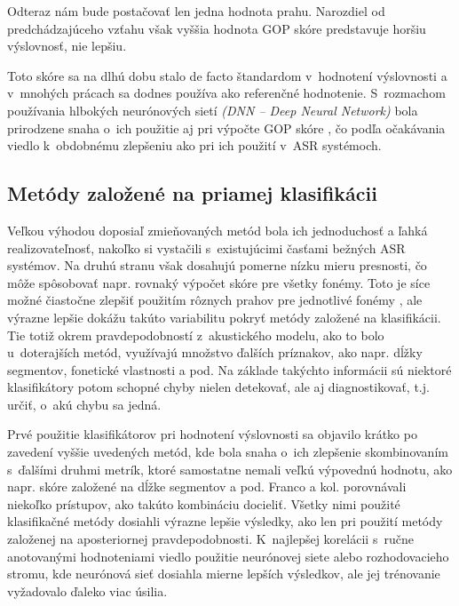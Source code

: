 Odteraz nám bude postačovať len jedna hodnota prahu. Narozdiel od predchádzajúceho vzťahu však vyššia hodnota GOP skóre predstavuje horšiu výslovnosť, nie lepšiu.

Toto skóre sa na dlhú dobu stalo de facto štandardom v~hodnotení výslovnosti a v~mnohých prácach sa dodnes používa ako referenčné hodnotenie.
S~rozmachom používania hlbokých neurónových sietí \textit{(DNN -- Deep Neural Network)} bola prirodzene snaha o~ich použitie aj pri výpočte GOP skóre \cite{Hu2013}, čo podľa očakávania viedlo k~obdobnému zlepšeniu ako pri ich použití v~ASR systémoch. 

\subsection{Metódy založené na priamej klasifikácii} \label{sec:classifier-based-scoring}

Veľkou výhodou doposiaľ zmieňovaných metód bola ich jednoduchosť a ľahká realizovateľnosť, nakoľko si vystačili s~existujúcimi časťami bežných ASR systémov. Na druhú stranu však dosahujú pomerne nízku mieru presnosti,
čo môže spôsobovať napr. rovnaký výpočet skóre pre všetky fonémy.
Toto je síce možné čiastočne zlepšiť použitím rôznych prahov pre jednotlivé fonémy \cite{Witt2000}, ale výrazne lepšie dokážu takúto variabilitu pokryť metódy založené na klasifikácii. Tie totiž okrem pravdepodobností z~akustického modelu, ako to bolo u~doterajších metód, využívajú množstvo ďalších príznakov, ako napr. dĺžky segmentov, fonetické vlastnosti a pod. Na základe takýchto informácii sú niektoré klasifikátory potom schopné chyby nielen detekovať, ale aj diagnostikovať, t.j. určiť, o~akú chybu sa jedná. 

Prvé použitie klasifikátorov pri hodnotení výslovnosti sa objavilo krátko po zavedení vyššie uvedených metód, kde bola snaha o~ich zlepšenie skombinovaním 
s~ďalšími druhmi metrík, ktoré samostatne nemali veľkú výpovednú hodnotu, ako napr. skóre založené na dĺžke segmentov \cite{Kim1997} a pod. Franco a kol. \cite{Franco2000} porovnávali niekoľko prístupov, ako takúto kombináciu docieliť. Všetky nimi použité klasifikačné metódy dosiahli výrazne lepšie výsledky, ako len pri použití metódy založenej na aposteriornej pravdepodobnosti. K~najlepšej korelácii s~ručne anotovanými hodnoteniami viedlo použitie neurónovej siete alebo rozhodovacieho stromu, kde neurónová sieť dosiahla mierne lepších výsledkov, ale jej trénovanie vyžadovalo ďaleko viac úsilia. 

